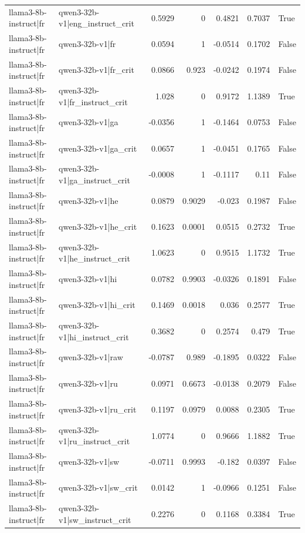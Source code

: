 \begin{table}
\begin{tabular}{l l r r r r l}
llama3-8b-instruct|fr & qwen3-32b-v1|eng_instruct_crit & 0.5929 & 0 & 0.4821 & 0.7037 & True \\
llama3-8b-instruct|fr & qwen3-32b-v1|fr & 0.0594 & 1 & -0.0514 & 0.1702 & False \\
llama3-8b-instruct|fr & qwen3-32b-v1|fr_crit & 0.0866 & 0.923 & -0.0242 & 0.1974 & False \\
llama3-8b-instruct|fr & qwen3-32b-v1|fr_instruct_crit & 1.028 & 0 & 0.9172 & 1.1389 & True \\
llama3-8b-instruct|fr & qwen3-32b-v1|ga & -0.0356 & 1 & -0.1464 & 0.0753 & False \\
llama3-8b-instruct|fr & qwen3-32b-v1|ga_crit & 0.0657 & 1 & -0.0451 & 0.1765 & False \\
llama3-8b-instruct|fr & qwen3-32b-v1|ga_instruct_crit & -0.0008 & 1 & -0.1117 & 0.11 & False \\
llama3-8b-instruct|fr & qwen3-32b-v1|he & 0.0879 & 0.9029 & -0.023 & 0.1987 & False \\
llama3-8b-instruct|fr & qwen3-32b-v1|he_crit & 0.1623 & 0.0001 & 0.0515 & 0.2732 & True \\
llama3-8b-instruct|fr & qwen3-32b-v1|he_instruct_crit & 1.0623 & 0 & 0.9515 & 1.1732 & True \\
llama3-8b-instruct|fr & qwen3-32b-v1|hi & 0.0782 & 0.9903 & -0.0326 & 0.1891 & False \\
llama3-8b-instruct|fr & qwen3-32b-v1|hi_crit & 0.1469 & 0.0018 & 0.036 & 0.2577 & True \\
llama3-8b-instruct|fr & qwen3-32b-v1|hi_instruct_crit & 0.3682 & 0 & 0.2574 & 0.479 & True \\
llama3-8b-instruct|fr & qwen3-32b-v1|raw & -0.0787 & 0.989 & -0.1895 & 0.0322 & False \\
llama3-8b-instruct|fr & qwen3-32b-v1|ru & 0.0971 & 0.6673 & -0.0138 & 0.2079 & False \\
llama3-8b-instruct|fr & qwen3-32b-v1|ru_crit & 0.1197 & 0.0979 & 0.0088 & 0.2305 & True \\
llama3-8b-instruct|fr & qwen3-32b-v1|ru_instruct_crit & 1.0774 & 0 & 0.9666 & 1.1882 & True \\
llama3-8b-instruct|fr & qwen3-32b-v1|sw & -0.0711 & 0.9993 & -0.182 & 0.0397 & False \\
llama3-8b-instruct|fr & qwen3-32b-v1|sw_crit & 0.0142 & 1 & -0.0966 & 0.1251 & False \\
llama3-8b-instruct|fr & qwen3-32b-v1|sw_instruct_crit & 0.2276 & 0 & 0.1168 & 0.3384 & True \\

\end{tabular}
\end{table}
